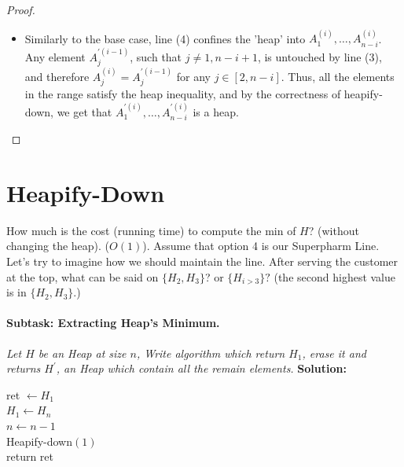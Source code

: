 \begin{proof}
\begin{enumerate}
\begin{itemize}
        \begin{equation*}
          \begin{split}
            A^{(i) }_{n-i+1},A^{(i) }_{n-i+2},A^{(i) }_{n-i+3},..A^{(i) }_{n} = A^{(i) }_{n-i+1},A^{\prime (i-1) }_{n-i+2},A^{\prime (i-1) }_{n-i+3},..A^{ \prime (i-1) }_{n}
          \end{split}
        \end{equation*}
        are the $i$ largest elements placed in order. 

       \item Similarly to the base case, line (4) confines the 'heap' into $A^{(i)}_{1}, \ldots, A^{(i)}_{n-i}$. Any element $A^{\prime (i-1)}_{j}$, such that $j \neq 1, n-i+1$, is untouched by line (3), and therefore $A^{(i)}_{j} = A^{\prime (i-1)}_{j}$ for any $j \in [2, n-i]$. Thus, all the elements in the range satisfy the heap inequality, and by the correctness of heapify-down, we get that $A^{\prime (i)}_{1}, \ldots, A^{\prime (i)}_{n-i}$ is a heap.

    \end{itemize}
\end{enumerate}
\end{proof}


\section{ Heapify-Down }

\ifdefined\Book
How much is the cost (running time) to compute the min of $H$? (without changing the heap). ($O\left( 1 \right)$). Assume that option 4 is our Superpharm Line. Let's try to imagine how we should maintain the line. After serving the customer at the top, what can be said on $ \{ H_{2}, H_{3}\}$? or $\{H_{i>3}\}?$ (the second highest value is in $\{H_{2}, H_{3} \}$.)   
\paragraph{Subtask: Extracting Heap's Minimum.} \textit{Let $H$ be an Heap at size $n$, Write algorithm which return $H_1$, erase it and returns $H^\prime$, an Heap which contain all the remain elements.} 
\textbf{Solution:} 

\begin{algorithm}[H]
ret $\leftarrow H_{1} $ \\
$ H_{1} \leftarrow H_{n} $  \\
$ n \leftarrow n -1 $ \\
Heapify-down$\left( 1 \right)$ \\
return ret  
\end{algorithm}

